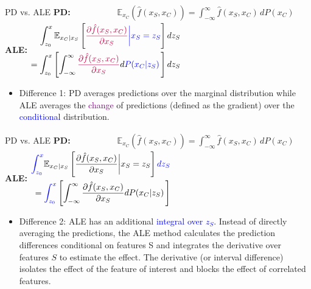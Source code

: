\documentclass[aspectratio=169]{../latex_main/tntbeamer}  %
\begin{document}

\begin{frame}{PD vs. ALE}
    \textbf{PD:}
    $
    \begin{aligned}
      \hspace{2cm} \mathbb{E}_{x_C} \left( \hat{f}(x_S, x_C) \right) = \int_{-\infty}^{\infty} \hat{f}(x_S, x_C) \, d P(x_C)
    \end{aligned}
    $ \\[2em]
    \textbf{ALE:}
    $
    \begin{aligned}
      \int_{z_{0}}^{x} \mathbb{E}_{x_C \vert x_S} \left[\textcolor{purple}{\frac{\partial \hat{f}(x_S, x_C)}{\partial x_S}} \textcolor{blue}{\bigg \vert x_S = z_S} \right] dz_S\\
        = \int_{z_{0}}^{x} \left[ \int_{-\infty}^{\infty}  \textcolor{purple}{\frac{\partial \hat{f}(x_S, x_C)}{\partial x_S}} d \textcolor{blue}{P(x_C | z_S) } \,   \right] dz_S
  \end{aligned}
    $
    \begin{itemize}
    \item \alert{Difference 1}: PD averages predictions over the marginal distribution while ALE averages the \textcolor{purple}{change} of predictions (defined as the gradient) over the \textcolor{blue}{conditional} distribution.
    \end{itemize}
\end{frame}


\begin{frame}{PD vs. ALE}
    \textbf{PD:}
    $
    \begin{aligned}
      \hspace{2cm} \mathbb{E}_{x_C} \left( \hat{f}(x_S, x_C) \right) = \int_{-\infty}^{\infty} \hat{f}(x_S, x_C) \, d P(x_C)
    \end{aligned}
    $ \\[2em]
    \textbf{ALE:}
    $
    \begin{aligned}
    \textcolor{blue}{\int_{z_{0}}^{x}} \mathbb{E}_{x_C \vert x_S} \left[\frac{\partial \hat{f}(x_S, x_C)}{\partial x_S} \bigg \vert x_S = z_S \right] \textcolor{blue}{dz_S}\\
  = \textcolor{blue}{\int_{z_{0}}^{x}} \left[ \int_{-\infty}^{\infty}\frac{\partial \hat{f}(x_S, x_C)}{\partial x_S} d P(x_C | z_S)  \,   \right]
  \end{aligned}
    $
    \begin{itemize}

    \item \alert{Difference 2}: ALE has an additional \textcolor{blue}{integral over $z_S$}. Instead of directly averaging the predictions, the ALE method calculates the prediction differences conditional on features S and integrates the derivative over features $S$ to estimate the effect. The derivative (or interval difference) isolates the effect of the feature of interest and blocks the effect of correlated features.
    \end{itemize}
\end{frame}
\end{document}
